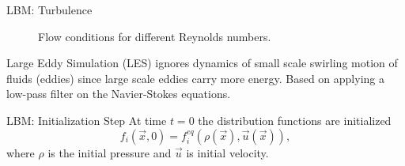 \documentclass{beamer}
\begin{document}
\begin{frame}{LBM: Turbulence}
\begin{figure}[H]
\centering
\begin{scriptsize}
\def\svgwidth{0.5\linewidth}

\end{scriptsize}
\caption{Flow conditions for different Reynolds numbers.}
\label{fig:reynold}
\end{figure}

Large Eddy Simulation (LES) ignores dynamics of small scale swirling motion of fluids (eddies) since large scale eddies carry more energy. Based on applying a low-pass filter on the Navier-Stokes equations.

\end{frame}
%


\begin{frame}{LBM: Initialization Step}
At time $t=0$ the distribution functions are initialized
\begin{equation}
f_i(\vec{x},0) = f_i^{eq} (\rho (\vec{x}), \vec{u} (\vec{x})),
\end{equation}
where $\rho$ is the initial pressure and $\vec{u}$ is initial velocity.
\end{frame}
\end{document}
